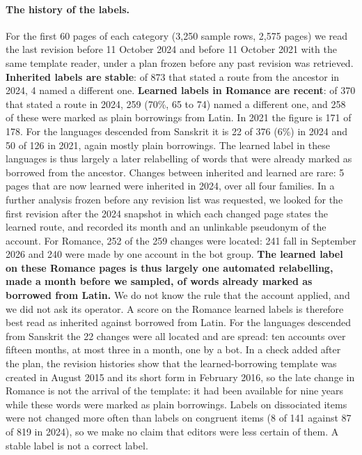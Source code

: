\documentclass[11pt]{article}
\begin{document}
\paragraph{The history of the labels.} For the first 60 pages of each category (3,250 sample rows, 2,575 pages) we read the last revision before 11 October 2024 and before 11 October 2021 with the same template reader, under a plan frozen before any past revision was retrieved. \textbf{Inherited labels are stable}: of 873 that stated a route from the ancestor in 2024, 4 named a different one. \textbf{Learned labels in Romance are recent}: of 370 that stated a route in 2024, 259 (70\%, 65 to 74) named a different one, and 258 of these were marked as plain borrowings from Latin. In 2021 the figure is 171 of 178. For the languages descended from Sanskrit it is 22 of 376 (6\%) in 2024 and 50 of 126 in 2021, again mostly plain borrowings. The learned label in these languages is thus largely a later relabelling of words that were already marked as borrowed from the ancestor. Changes between inherited and learned are rare: 5 pages that are now learned were inherited in 2024, over all four families. In a further analysis frozen before any revision list was requested, we looked for the first revision after the 2024 snapshot in which each changed page states the learned route, and recorded its month and an unlinkable pseudonym of the account. For Romance, 252 of the 259 changes were located: 241 fall in September 2026 and 240 were made by one account in the bot group. \textbf{The learned label on these Romance pages is thus largely one automated relabelling, made a month before we sampled, of words already marked as borrowed from Latin.} We do not know the rule that the account applied, and we did not ask its operator. A score on the Romance learned labels is therefore best read as inherited against borrowed from Latin. For the languages descended from Sanskrit the 22 changes were all located and are spread: ten accounts over fifteen months, at most three in a month, one by a bot. In a check added after the plan, the revision histories show that the learned-borrowing template was created in August 2015 and its short form in February 2016, so the late change in Romance is not the arrival of the template: it had been available for nine years while these words were marked as plain borrowings. Labels on dissociated items were not changed more often than labels on congruent items (8 of 141 against 87 of 819 in 2024), so we make no claim that editors were less certain of them. A stable label is not a correct label.
\end{document}
